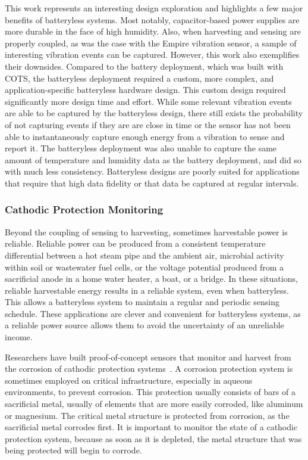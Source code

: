 This work represents an interesting design exploration and highlights a few major benefits of batteryless systems. Most notably, capacitor-based power supplies are more durable in the face of high humidity. Also, when harvesting and sensing are properly coupled, as was the case with the Empire vibration sensor, a sample of interesting vibration events can be captured.
However, this work also exemplifies their downsides.
Compared to the battery deployment, which was built with COTS, the batteryless deployment required a custom, more complex, and application-specific batteryless hardware design.
This custom design required significantly more design time and effort.
While some relevant vibration events are able to be captured by the batteryless design, there still exists the probability of not capturing events if they are are close in time or the sensor has not been able to instantaneously capture enough energy from a vibration to sense and report it.
The batteryless deployment was also unable to capture the same amount of temperature and humidity data as the battery deployment, and did so with much less consistency.
Batteryless designs are poorly suited for applications that require that high data fidelity or that data be captured at regular intervals.

\subsubsection{Cathodic Protection Monitoring}
Beyond the coupling of sensing to harvesting, sometimes harvestable power is reliable.
Reliable power can be produced from a consistent temperature differential between a hot steam pipe and the ambient air, microbial activity within soil or wastewater fuel cells, or the voltage potential produced from a sacrificial anode in a home water heater, a boat, or a bridge.
In these situations, reliable harvestable energy results in a reliable system, even when batteryless.
This allows a batteryless system to maintain a regular and periodic sensing schedule.
These applications are clever and convenient for batteryless systems, as a reliable power source allows them to avoid the uncertainty of an unreliable income.

Researchers have built proof-of-concept sensors that monitor and harvest from the corrosion of cathodic protection systems~\cite{jagtap2021repurposing}.
A corrosion protection system is sometimes employed on critical infrastructure, especially in aqueous environments, to prevent corrosion.
This protection usually consists of bars of a sacrificial metal, usually of elements that are more easily corroded, like aluminum or magnesium.
The critical metal structure is protected from corrosion, as the sacrificial metal corrodes first.
It is important to monitor the state of a cathodic protection system, because as soon as it is depleted, the metal structure that was being protected will begin to corrode.

